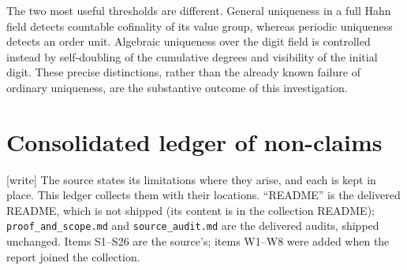 \documentclass[11pt,a4paper]{article}
\numberwithin{equation}{section}
\theoremstyle{definition}
\theoremstyle{remark}
\newcommand{\rpath}[1]{\nolinkurl{#1}}%
\newcommand{\wtag}{\textup{[write]}}%
\begin{document}
The two most useful thresholds are different. General uniqueness in a
full Hahn field detects countable cofinality of its value group, whereas
periodic uniqueness detects an order unit. Algebraic uniqueness over the
digit field is controlled instead by self-doubling of the cumulative
degrees and visibility of the initial digit. These precise distinctions,
rather than the already known failure of ordinary uniqueness, are the
substantive outcome of this investigation.

\section{Consolidated ledger of non-claims}\label{ocf:sec:nonclaims}

\wtag{} The source states its limitations where they arise, and each is
kept in place. This ledger collects them with their locations.
``README'' is the delivered README, which is not shipped (its content is in
the collection README); \rpath{proof\_and\_scope.md} and
\rpath{source\_audit.md} are the delivered audits, shipped unchanged.
Items S1--S26 are the source's; items W1--W8 were added when the report
joined the collection.
\end{document}
